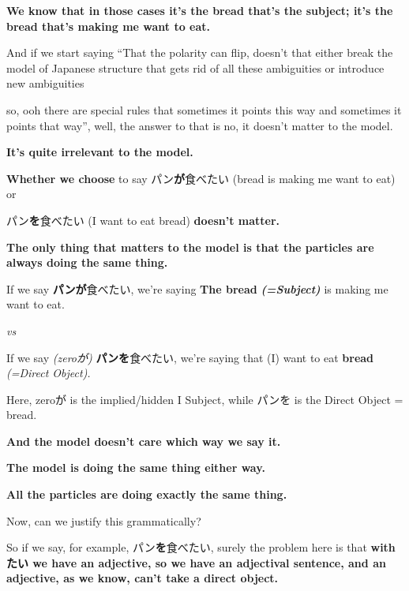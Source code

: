 {\bf We know that in those cases it's the bread that's the subject; it's the bread that's making me want to eat.}

\thinrule

And if we start saying\crlf
“That the polarity can flip, doesn't that either break the model of Japanese structure\crlf
that gets rid of all these ambiguities or introduce new ambiguities

so, ooh there are special rules that sometimes it points this way and sometimes it points that way”, well, the answer to that is no, it doesn't matter to the model.

{\bf It's quite irrelevant to the model.}

{}

{\bf Whether we choose} to say パン{\bf が}食べたい (bread is making me want to eat) or

パン{\bf を}食べたい (I want to eat bread) {\bf doesn't matter.}

{\bf The only thing that matters to the model is that the particles are always doing the same thing.}

If we say {\bf パンが}食べたい, we're saying {\bf The bread} {\bf {\em (=Subject)}} is making me want to eat.

{\em vs}

If we say {\em (zeroが)} {\bf パンを}食べたい, we're saying that (I) want to eat {\bf bread} {\em (=Direct Object).}

Here, zeroが is the implied/hidden I Subject, while パンを is the Direct Object = bread.

{}

{\bf And the model doesn't care which way we say it.}

{\bf The model is doing the same thing either way.}

{\bf All the particles are doing exactly the same thing.}

\stopsectionlevel

\startsectionlevel[title={How to justify the model grammatically?},reference={how-to-justify-the-model-grammatically}]

Now, can we justify this grammatically?

{}

So if we say, for example, パン{\bf を}食べたい, surely the problem here is that\crlf
{\bf with たい we have an adjective, so we have an adjectival sentence,\crlf
and an adjective, as we know, can't take a direct object.}

